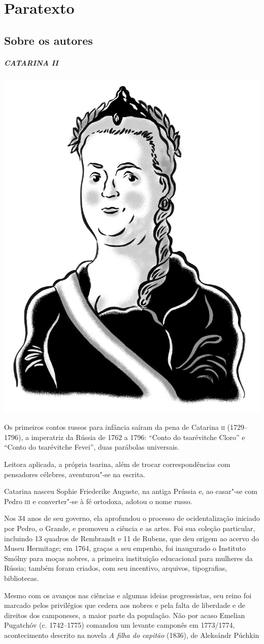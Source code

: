 \chapter{Paratexto}\label{paratexto}
\begingroup\scriptsize


\section{Sobre os autores}

\paragraph{CATARINA II }
\noindent\includegraphics[width=.8in]{./imgs/autor1.jpg}

\noindent{}Os primeiros contos russos para infância saíram da pena de Catarina \textsc{ii}
(1729--1796), a imperatriz da Rússia de 1762 a 1796: ``Conto do
tsarévitche Cloro'' e ``Conto do tsarévitche Fevei'', duas parábolas universais.

Leitora aplicada, a própria tsarina, além de trocar correspondências com
pensadores célebres, aventurou"-se na escrita.

Catarina nasceu Sophie Friederike Auguste, na antiga Prússia e, ao
casar"-se com Pedro \textsc{iii} e converter"-se à fé ortodoxa, adotou o nome
russo.

Nos 34 anos de seu governo, ela aprofundou o processo de ocidentalização
iniciado por Pedro, o Grande, e promoveu a ciência e as artes. Foi sua
coleção particular, incluindo 13 quadros de Rembrandt e 11 de Rubens,
que deu origem ao acervo do Museu Hermitage; em 1764, graças a seu
empenho, foi inaugurado o Instituto Smólny para moças nobres, a primeira
instituição educacional para mulheres da Rússia; também foram criados,
com seu incentivo, arquivos, tipografias, bibliotecas.

Mesmo com os avanços nas ciências e algumas ideias progressistas, seu
reino foi marcado pelos privilégios que cedera aos nobres e pela falta
de liberdade e de direitos dos camponeses, a maior parte da população.
Não por acaso Emelian Pugatchóv (c. 1742--1775) comandou um levante
camponês em 1773/1774, acontecimento descrito na novela \emph{A filha do
capitão} (1836), de Aleksándr Púchkin


